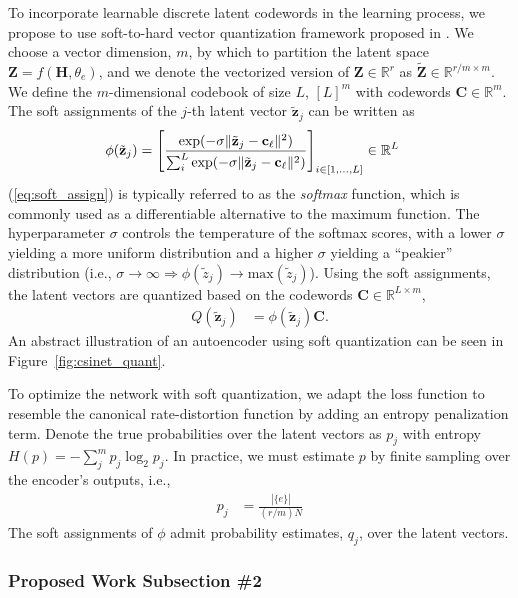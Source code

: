 To incorporate learnable discrete latent codewords in the learning process, we propose to use soft-to-hard vector quantization framework proposed in \cite{ref:Agustsson2017SoftToHard}. We choose a vector dimension, $m$, by which to partition the latent space $\mathbf Z = f(\mathbf H, \theta_e)$, and we denote the vectorized version of $\mathbf Z \in \mathbb R^{r}$ as $\tilde{\mathbf Z} \in \mathbb R^{r/m \times m}$. We define the $m$-dimensional codebook of size $L$, $[L]^m$ with codewords $\mathbf C \in \mathbb R^m$. The soft assignments of the $j$-th latent vector $\tilde{\mathbf z}_j$ can be written as
\begin{align}
\phi(\tilde{\mathbf z}_j) &= \left[\frac{\text{exp}(-\sigma \Arrowvert \tilde{\mathbf z}_j - \mathbf c_\ell\Arrowvert^2)}{\sum_{i}^L\text{exp}(-\sigma \Arrowvert \tilde{\mathbf z}_j - \mathbf c_\ell\Arrowvert^2)}\right]_{i\in [1,\dots,L]} \in \mathbb R^L \label{eq:soft_assign}
\end{align}
(\ref{eq:soft_assign}) is typically referred to as the \emph{softmax} function, which is commonly used as a differentiable alternative to the maximum function. The hyperparameter $\sigma$ controls the temperature of the softmax scores, with a lower $\sigma$ yielding a more uniform distribution and a higher $\sigma$ yielding a ``peakier'' distribution (i.e., $\sigma \to \infty \Rightarrow \phi(\tilde z_j) \to \text{max}(\tilde z_j)$). Using the soft assignments, the latent vectors are quantized based on the codewords $\mathbf C \in \mathbb R^{L \times m}$,
\begin{align}
Q(\tilde{\mathbf z}_j) &= \phi(\tilde{\mathbf z}_j) \mathbf C. \label{eq:soft_quant}
\end{align}
An abstract illustration of an autoencoder using soft quantization can be seen in Figure~\ref{fig:csinet_quant}.

To optimize the network with soft quantization, we adapt the loss function to resemble the canonical rate-distortion function by adding an entropy penalization term. Denote the true probabilities over the latent vectors as $p_j$ with entropy $H(p) = -\sum_{j}^m p_j\log_2 p_j$. In practice, we must estimate $p$ by finite sampling over the encoder's outputs, i.e.,
\begin{align*}
p_j &= \frac{|\{e\}|}{(r/m)N}
\end{align*}
The soft assignments of $\phi$ admit probability estimates, $q_j$, over the latent vectors.

\subsubsection{Proposed Work Subsection \#2}
\blindtext
\blindtext
